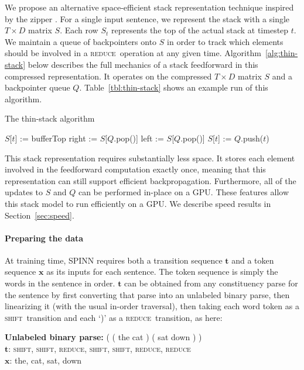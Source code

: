 \documentclass[11pt]{article}
\newcommand{\shift}{\textsc{shift}}
\newcommand{\reduce}{\textsc{reduce}}
\begin{document}
We propose an alternative space-efficient stack representation technique inspired by the zipper \citep{huet1997zipper}. For a single input sentence, we represent the stack with a single $T \times D$ matrix $S$. Each row $S_t$ represents the top of the actual stack at timestep $t$. We maintain a queue of backpointers onto $S$ in order to track which elements should be involved in a \reduce~operation at any given time. Algorithm~\ref{alg:thin-stack} below describes the full mechanics of a stack feedforward in this compressed representation. It operates on the compressed $T \times D$ matrix $S$ and a backpointer queue $Q$. Table~\ref{tbl:thin-stack} shows an example run of this algorithm.

\begin{algorithm}[t]
\caption{The thin-stack algorithm}
\label{alg:thin-stack}
\begin{algorithmic}[1]
    \If{op = \shift}
      \State $S$[$t$] := bufferTop
    \ElsIf{op = \reduce}
      \State right := $S$[$Q$.pop()]
      \State left := $S$[$Q$.pop()]
      \State $S$[$t$] := 
    \EndIf
    \State $Q$.push($t$)
  \EndFunction
\end{algorithmic}
\end{algorithm}

This stack representation requires substantially less space. It stores each element involved in the feedforward computation exactly once, meaning that this representation can still support efficient backpropagation. Furthermore, all of the updates to $S$ and $Q$ can be performed in-place on a GPU. These features allow this stack model to run efficiently on a GPU. We describe speed results in Section~\ref{sec:speed}.

\paragraph{Preparing the data} At training time, SPINN requires both a transition sequence $\mathbf t$  and a token sequence $\mathbf x$ as its inputs for each sentence. The token sequence is simply the words in the sentence in order. $\mathbf t$ can be obtained from any constituency parse for the sentence by first converting that parse into an unlabeled binary parse, then linearizing it (with the usual in-order traversal), then taking each word token as a \shift~transition and each `)' as a \reduce~transition, as here:

\vspace{0.5em}
{\noindent\small
{\bf Unlabeled binary parse:} ( ( the cat ) ( sat down ) )\\
{$\mathbf t$}: \shift, \shift, \reduce, \shift, \shift, \reduce, \reduce\\
{$\mathbf x$}: the, cat, sat, down
}
\end{document}
